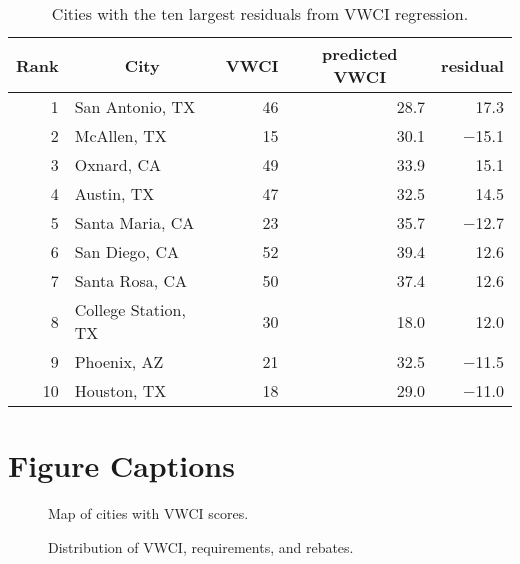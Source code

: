 \documentclass[draft,linenumbers]{agujournal}
\begin{document}
\begin{table}[htbp]
\centering
\caption{Cities with the ten largest residuals from VWCI regression.}
\label{tab:vwci_top_residuals}
\begin{tabular}{rlrrr}
  \hline
\multicolumn{1}{c}{ Rank } & \multicolumn{1}{c}{ City } & \multicolumn{1}{c}{ VWCI } & \multicolumn{1}{c}{ predicted VWCI } & \multicolumn{1}{c}{ residual } \\
  \hline
 1 & San Antonio, TX & 46 & 28.7 & 17.3 \\
   2 & McAllen, TX & 15 & 30.1 & $-$15.1 \\
   3 & Oxnard, CA & 49 & 33.9 & 15.1 \\
   4 & Austin, TX & 47 & 32.5 & 14.5 \\
   5 & Santa Maria, CA & 23 & 35.7 & $-$12.7 \\
   6 & San Diego, CA & 52 & 39.4 & 12.6 \\
   7 & Santa Rosa, CA & 50 & 37.4 & 12.6 \\
   8 & College Station, TX & 30 & 18.0 & 12.0 \\
   9 & Phoenix, AZ & 21 & 32.5 & $-$11.5 \\
  10 & Houston, TX & 18 & 29.0 & $-$11.0 \\
   \hline
\end{tabular}
\end{table}


%
%
\clearpage
\section*{Figure Captions}

\begin{figure}[h]
\caption{Map of cities with VWCI scores.}\label{fig:vwci_map}
\end{figure}


\begin{figure}[h]
\caption{Distribution of VWCI, requirements, and rebates.}\label{fig:vwci_histogram}
\end{figure}
\end{document}
